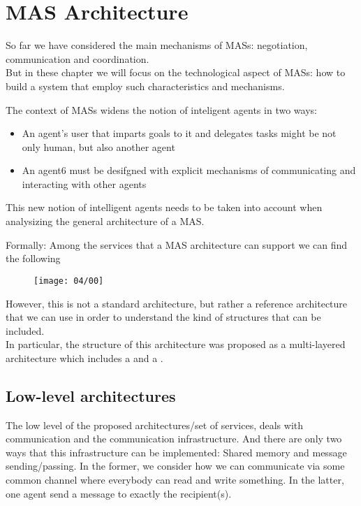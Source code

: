 \chapter{MAS Architecture}
\minitoc

So far we have considered the main mechanisms of MASs: negotiation, communication and coordination.\\
But in these chapter we will focus on the technological aspect of MASs: how to build a system that employ such characteristics and mechanisms.

The context of MASs widens the notion of inteligent agents in two ways:
\begin{itemize}
\item An agent's user that imparts goals to it and delegates tasks might be not only human, but also another agent
\item An agent6 must be desifgned with explicit mechanisms of communicating and interacting with other agents
\end{itemize}
This new notion of intelligent agents needs to be taken into account when analysizing the general architecture of a MAS.

Formally:
Among the services that a MAS architecture can support we can find the following

\begin{figure}[!h]
\centering
\texttt{[image: 04/00]}
\end{figure}

However, this is not a standard architecture, but rather a reference architecture that we can use in order to understand the kind of structures that can be included.\\
In particular, the structure of this architecture was proposed as a multi-layered architecture which includes a  and a .

\section{Low-level architectures}
The low level of the proposed architectures/set of services, deals with communication and the communication infrastructure. And there are only two ways that this infrastructure can be implemented: Shared memory and message sending/passing.
In the former, we consider how we can communicate via some common  channel where everybody can read and write something. In the latter, one agent send a message to exactly the recipient(s).

